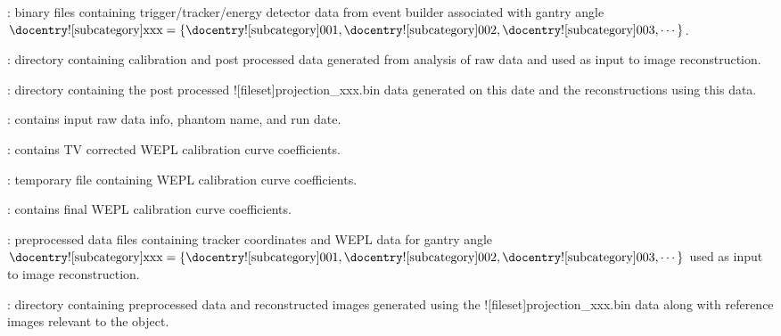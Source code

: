 \begin{tcbenvironment}
\begin{tcbparagraph}
\begin{ThinEnum}
\begin{ThinEnum}
\begin{ThinEnum}
\begin{ThinEnum}
\begin{ThinEnum}
                        \begin{ThinEnum}
                            \item {} : binary files containing trigger/tracker/energy detector data from event builder associated with gantry angle $\text{\docentry![subcategory]{xxx}} =\{\text{\docentry![subcategory]{001}}, \text{\docentry![subcategory]{002}}, \text{\docentry![subcategory]{003}}, \cdots\}$.
                        \end{ThinEnum}
                        \item {} : directory containing calibration and post processed data generated from analysis of raw data and used as input to image reconstruction.
                        \begin{ThinEnum}
					\item {} : directory containing the post processed \docentry![fileset]{projection\_xxx.bin} data generated on this date and the reconstructions using this data.
                            	\begin{ThinEnum}
						\item {} : contains input raw data info, phantom name, and run date.
                    			\item {} : contains TV corrected WEPL calibration curve coefficients.
						\item {} : temporary file containing WEPL calibration curve coefficients.
                                	\item {} : contains final WEPL calibration curve coefficients.
                                	\item {} : preprocessed data files containing tracker coordinates and WEPL data for gantry angle $\text{\docentry![subcategory]{xxx}} =\{\text{\docentry![subcategory]{001}}, \text{\docentry![subcategory]{002}}, \text{\docentry![subcategory]{003}}, \cdots\}$ used as input to image reconstruction.
                               \item {} : directory containing preprocessed data and reconstructed images generated using the \docentry![fileset]{projection\_xxx.bin} data along with reference images relevant to the object.

\end{ThinEnum}
\end{ThinEnum}
\end{ThinEnum}
\end{ThinEnum}
\end{ThinEnum}
\end{ThinEnum}
\end{ThinEnum}
\end{tcbparagraph}
\end{tcbenvironment}
